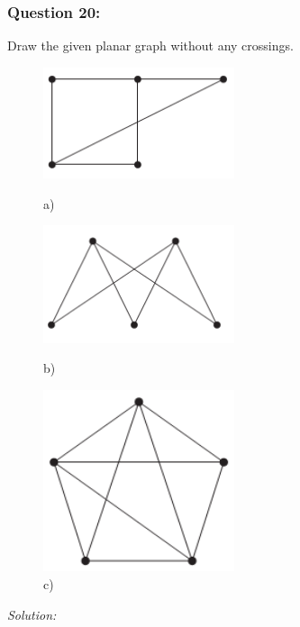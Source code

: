 \documentclass[a4paper]{article}
\begin{document}
	\subsubsection*{Question 20:}
	Draw the given planar graph without any crossings.
	\begin{figure}[H]
		\begin{minipage}{0.3\textwidth}
			\centering
			\includegraphics[width=0.5\textwidth]{tut920_1.png}
			\caption*{a)}
		\end{minipage}
		\begin{minipage}{0.3\textwidth}
			\centering
			\includegraphics[width=0.5\textwidth]{tut920_2.png}
			\caption*{b)}
		\end{minipage}
		\begin{minipage}{0.3\textwidth}
			\centering
			\includegraphics[width=0.5\textwidth]{tut920_3.png}
			\caption*{c)}
		\end{minipage}
	\end{figure}
	\textit{Solution:}\\
\end{document}
